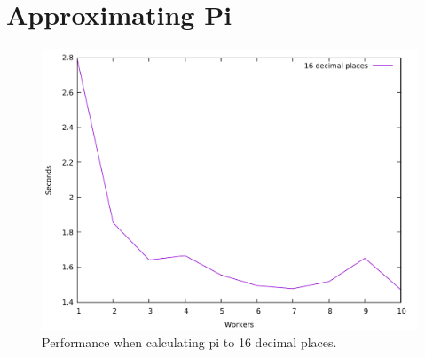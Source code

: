\documentclass[journal]{IEEEtran}
\begin{document}
\newpage

\section{Approximating Pi}
\begin{figure}[h]
	\centering
	\includegraphics[width=0.7\linewidth]{../results/pi}
	\caption{Performance when calculating pi to 16 decimal places.}
	\label{fig:pi}
\end{figure}



\printbibliography

%
%
\end{document}
